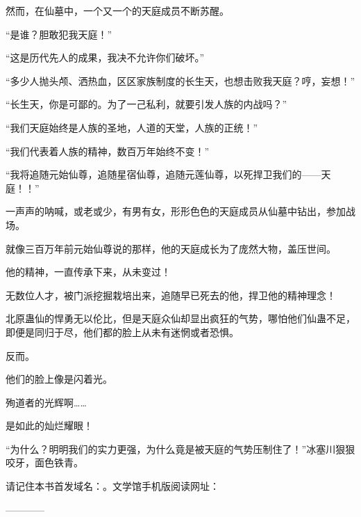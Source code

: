 \begin{this_body}
然而，在仙墓中，一个又一个的天庭成员不断苏醒。

“是谁？胆敢犯我天庭！”

“这是历代先人的成果，我决不允许你们破坏。”

“多少人抛头颅、洒热血，区区家族制度的长生天，也想击败我天庭？哼，妄想！”

“长生天，你是可鄙的。为了一己私利，就要引发人族的内战吗？”

“我们天庭始终是人族的圣地，人道的天堂，人族的正统！”

“我们代表着人族的精神，数百万年始终不变！”

“我将追随元始仙尊，追随星宿仙尊，追随元莲仙尊，以死捍卫我们的——天庭！！”

一声声的呐喊，或老或少，有男有女，形形色色的天庭成员从仙墓中钻出，参加战场。

就像三百万年前元始仙尊说的那样，他的天庭成长为了庞然大物，盖压世间。

他的精神，一直传承下来，从未变过！

无数位人才，被门派挖掘栽培出来，追随早已死去的他，捍卫他的精神理念！

北原蛊仙的悍勇无以伦比，但是天庭众仙却显出疯狂的气势，哪怕他们仙蛊不足，即便是同归于尽，他们都的脸上从未有迷惘或者恐惧。

反而。

他们的脸上像是闪着光。

殉道者的光辉啊……

是如此的灿烂耀眼！

“为什么？明明我们的实力更强，为什么竟是被天庭的气势压制住了！”冰塞川狠狠咬牙，面色铁青。

请记住本书首发域名：。文学馆手机版阅读网址：

------------

\end{this_body}

